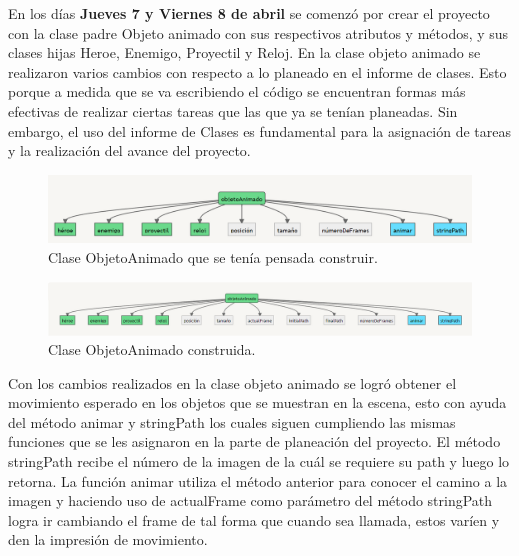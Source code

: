 \documentclass{article}
\begin{document}
En los días \textbf{Jueves 7 y Viernes 8 de abril} se comenzó por crear el proyecto con la clase padre Objeto animado con sus respectivos atributos y métodos, y sus clases hijas Heroe, Enemigo, Proyectil y Reloj.
En la clase objeto animado se realizaron varios cambios con respecto a lo planeado en el informe de clases. Esto porque a medida que se va escribiendo el código se encuentran formas más efectivas de realizar ciertas tareas que las que ya se tenían planeadas. Sin embargo, el uso del informe de Clases es fundamental para la asignación de tareas y la realización del avance del proyecto.

\newpage
\begin{figure}[h]
\includegraphics[scale=0.5]{Images/ObjetoAnimado.png}
\centering
\caption{Clase ObjetoAnimado que se tenía pensada construir.}
\label{fig:objetoAnimado}
\end{figure}

\begin{figure}[h]
\includegraphics[scale=0.6]{Images/newObjetoanimado.png}
\centering
\caption{Clase ObjetoAnimado construida.}
\label{fig:newobjetoAnimado}
\end{figure}

Con los cambios realizados en la clase objeto animado se logró obtener el movimiento esperado en los objetos que se muestran en la escena, esto con ayuda del método animar y stringPath los cuales siguen cumpliendo las mismas funciones que se les asignaron en la parte de planeación del proyecto. El método stringPath recibe el número de la imagen de la cuál se requiere su path y luego lo retorna. La función animar utiliza el método anterior para conocer el camino a la imagen y haciendo uso de actualFrame como parámetro del método stringPath logra ir cambiando el frame de tal forma que cuando sea llamada, estos varíen y den la impresión de movimiento.
\end{document}
